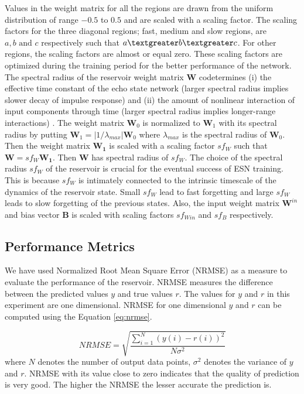 Values in the weight matrix for all the regions are drawn from the uniform distribution of range $-0.5$ to $0.5$ and are scaled with a scaling factor. The scaling factors for the three diagonal regions; fast, medium and slow regions, are $a, b \text{ and } c$ respectively such that $a \textgreater b \textgreater c$. For other regions, the scaling factors are almost or equal zero. These scaling factors are optimized during the training period for the better performance of the network.\\
The spectral radius of the reservoir weight matrix \textbf{W} codetermines (i) the effective time constant of the echo state network (larger spectral radius implies slower decay of impulse response) and (ii) the amount of nonlinear interaction of input components through time (larger spectral radius implies longer-range interactions) \cite{Jaeger:2007}.
  The weight matrix $\mathbf{W}_0$ is normalized to  $\mathbf{W}_1$ with its spectral radius  by putting $\mathbf{W}_1 = \left| 1/\lambda _{max}\right| \mathbf{W}_0$ where $\lambda _{max}$ is the spectral radius of $\mathbf{W}_0$. Then the weight matrix $\mathbf{W_1}$ is scaled with a scaling factor $sf_W$ such that $\mathbf{W} = sf_W \mathbf{W_1}$. Then $\mathbf{W}$ has spectral radius of $sf_W$. The choice of the spectral radius $sf_W$ of the reservoir is crucial for the eventual success of ESN training. This is because $sf_W$ is  intimately connected to the intrinsic timescale of the dynamics of the reservoir state. Small $sf_W$ lead to fast forgetting and large $sf_W$ leads to slow forgetting of the previous states.
  Also, the input weight matrix $\mathbf{W}^{in}$  and bias vector $\mathbf{B}$ is scaled with scaling factors $sf_{Win}$ and $sf_B$ respectively. 

\subsection{Performance Metrics}\label{performance_metrics}
\indent \indent
We have used Normalized Root Mean Square Error (NRMSE) as a measure to evaluate the performance of the reservoir. NRMSE measures the difference between the predicted values $y$ and true values $r$. The values for $y$ and $r$ in this experiment are one dimensional. NRMSE for one dimensional $y$ and $r$ can be computed using the Equation \eqref{eq:nrmse}.


\begin{equation}
	NRMSE = \sqrt{\frac{\sum_{i=1}^N(y(i)-r(i))^2}{N \sigma ^2}}
\label{eq:nrmse}
\end{equation}
where $N$ denotes the number of output data points, $\sigma^2$ denotes the variance of $y$ and $r$. NRMSE with its value close to zero indicates that the quality of prediction is very good. The higher the NRMSE the lesser accurate the prediction is.


